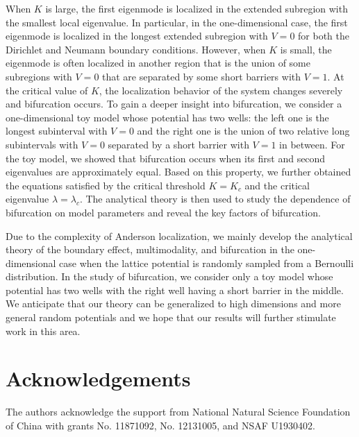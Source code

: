 \documentclass[a4paper,11pt]{article}
\begin{document}
When $K$ is large, the first eigenmode is localized in the extended subregion with the smallest local eigenvalue. In particular, in the one-dimensional case, the first eigenmode is localized in the longest extended subregion with $V = 0$ for both the Dirichlet and Neumann boundary conditions. However, when $K$ is small, the eigenmode is often localized in another region that is the union of some subregions with $V = 0$ that are separated by some short barriers with $V = 1$. At the critical value of $K$, the localization behavior of the system changes severely and bifurcation occurs. To gain a deeper insight into bifurcation, we consider a one-dimensional toy model whose potential has two wells: the left one is the longest subinterval with $V = 0$ and the right one is the union of two relative long subintervals with $V = 0$ separated by a short barrier with $V = 1$ in between. For the toy model, we showed that bifurcation occurs when its first and second eigenvalues are approximately equal. Based on this property, we further obtained the equations satisfied by the critical threshold $K = K_c$ and the critical eigenvalue $\lambda = \lambda_c$. The analytical theory is then used to study the dependence of bifurcation on model parameters and reveal the key factors of bifurcation.

Due to the complexity of Anderson localization, we mainly develop the analytical theory of the boundary effect, multimodality, and bifurcation in the one-dimensional case when the lattice potential is randomly sampled from a Bernoulli distribution. In the study of bifurcation, we consider only a toy model whose potential has two wells with the right well having a short barrier in the middle. We anticipate that our theory can be generalized to high dimensions and more general random potentials and we hope that our results will further stimulate work in this area.


\section*{Acknowledgements}
The authors acknowledge the support from National Natural Science Foundation of China with
grants No. 11871092, No. 12131005, and NSAF U1930402.
\end{document}
